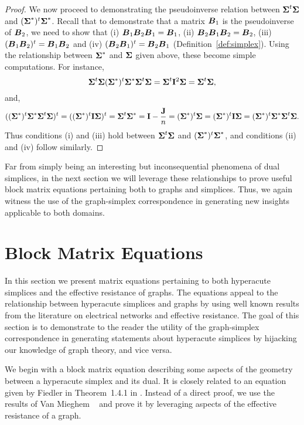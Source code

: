\begin{proof}
	We now proceed to demonstrating the pseudoinverse relation between $\boldsymbol{\Sigma}^t\boldsymbol{\Sigma}$ and $(\boldsymbol{\Sigma}^*)^t\boldsymbol{\Sigma}^*$. Recall that to demonstrate that  a matrix $\vb*{B}_1$ is the pseudoinverse of $\vb*{B}_2$, we need  to show that (i) $\vb*{B}_1\vb*{B}_2\vb*{B}_1=\vb*{B}_1$, (ii) $\vb*{B}_2\vb*{B}_1\vb*{B}_2=\vb*{B}_2$, (iii) $(\vb*{B}_1\vb*{B}_2)^t = \vb*{B}_1\vb*{B}_2$ and  (iv)  $(\vb*{B}_2\vb*{B}_1)^t = \vb*{B}_2\vb*{B}_1$ (Definition~\ref{def:simplex}). Using the relationship between  $\boldsymbol{\Sigma}^*$ and  $\boldsymbol{\Sigma}$ given above, these become simple computations. For instance, 
	\begin{equation*}
	\boldsymbol{\Sigma}^t\boldsymbol{\Sigma}(\boldsymbol{\Sigma}^*)^t\boldsymbol{\Sigma}^*\boldsymbol{\Sigma}^t\boldsymbol{\Sigma} = \boldsymbol{\Sigma}^t \vb{I}^2 \boldsymbol{\Sigma}=\boldsymbol{\Sigma}^t\boldsymbol{\Sigma},
	\end{equation*}
	and, 
	\begin{align*}
	((\boldsymbol{\Sigma}^*)^t\boldsymbol{\Sigma}^* \boldsymbol{\Sigma}^t\boldsymbol{\Sigma})^t = ((\boldsymbol{\Sigma}^*)^t\vb{I}\boldsymbol{\Sigma})^t = \boldsymbol{\Sigma}^t\boldsymbol{\Sigma}^* = \vb{I}-\frac{\vb{J}}{n} = (\boldsymbol{\Sigma}^*)^t\boldsymbol{\Sigma} = (\boldsymbol{\Sigma}^*)^t\vb{I}\boldsymbol{\Sigma} = (\boldsymbol{\Sigma}^*)^t\boldsymbol{\Sigma}^*\boldsymbol{\Sigma}^t\boldsymbol{\Sigma}.
	\end{align*} 
	Thus  conditions (i) and (iii) hold between $\boldsymbol{\Sigma}^t\boldsymbol{\Sigma}$ and  $(\boldsymbol{\Sigma}^*)^t\boldsymbol{\Sigma}^*$, and conditions (ii) and (iv) follow similarly. 
\end{proof}



Far from simply being an interesting but inconsequential phenomena of dual simplices, in the next section  we  will leverage these  relationships to prove useful block matrix equations pertaining both  to graphs and  simplices. Thus,  we again witness  the use of the graph-simplex correspondence in  generating new insights applicable to  both domains. 

\section{Block Matrix Equations}
\label{sec:block_matrix}
In this section we present matrix equations pertaining to both hyperacute simplices and the effective resistance of graphs. The equations appeal to the relationship between hyperacute simplices and graphs by using well known results from the literature on electrical networks and effective resistance. The goal of this section is to demonstrate to the reader the utility of the graph-simplex correspondence in generating statements about hyperacute simplices by hijacking our knowledge of graph theory,  and vice versa. 

We begin with a block matrix equation describing some aspects of  the geometry between a  hyperacute simplex and its dual. It is closely related to an equation given by Fiedler in Theorem~1.4.1 in \cite{fiedler2011matrices}. Instead  of a direct proof, we use the results of Van Mieghem \etal~\cite{van2017pseudoinverse} and prove it by leveraging aspects of the effective resistance of a graph.  

